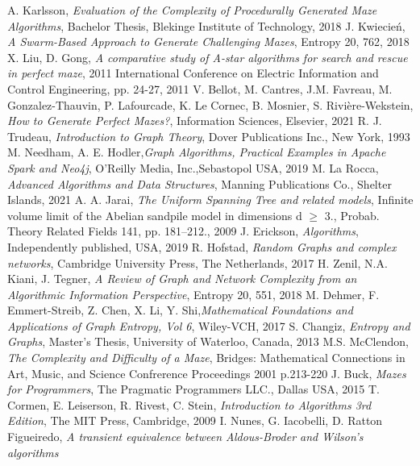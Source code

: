 
\begin{thebibliography}{100}
A. Karlsson, \emph{Evaluation of the Complexity of Procedurally Generated Maze Algorithms}, Bachelor Thesis,
Blekinge Institute of Technology, 2018
J. Kwiecień, \emph{A Swarm-Based Approach to Generate Challenging Mazes}, Entropy 20, 762, 2018
X. Liu, D. Gong, \emph{A comparative study of A-star algorithms for search and rescue in perfect maze}, 2011 International Conference
on Electric Information and Control Engineering, pp. 24-27, 2011
V. Bellot, M. Cantres, J.M. Favreau, M. Gonzalez-Thauvin, P. Lafourcade, K. Le Cornec, B. Mosnier, S. Rivière-Wekstein,
\emph{How to Generate Perfect Mazes?}, Information Sciences, Elsevier, 2021
R. J. Trudeau, \emph{Introduction to Graph Theory}, Dover Publications Inc., New York, 1993
M. Needham, A. E. Hodler,\emph{Graph Algorithms, Practical Examples in Apache Spark and Neo4j}, O’Reilly Media, Inc.,Sebastopol USA, 2019
M. La Rocca, \emph{Advanced Algorithms and Data Structures}, Manning Publications Co., Shelter Islands, 2021
A. A. Jarai, \emph{The Uniform Spanning Tree and related models},  Infinite volume limit of the Abelian sandpile model in
dimensions d $≥$ 3., Probab. Theory Related Fields 141, pp. 181–212., 2009
J. Erickson, \emph{Algorithms}, Independently published, USA, 2019
R. Hofstad, \emph{Random Graphs and complex networks}, Cambridge University Press, The Netherlands, 2017
H. Zenil, N.A. Kiani, J. Tegner, \emph{A Review of Graph and Network Complexity from an Algorithmic Information Perspective},
Entropy 20, 551, 2018
M. Dehmer, F. Emmert-Streib, Z. Chen, X. Li, Y. Shi,\emph{Mathematical Foundations and Applications of Graph Entropy, Vol 6},
Wiley-VCH, 2017
S. Changiz, \emph{Entropy and Graphs}, Master's Thesis, University of Waterloo, Canada, 2013
M.S. McClendon, \emph{The Complexity and Difficulty of a Maze}, Bridges: Mathematical Connections in Art, Music,
and Science Confrerence Proceedings 2001 p.213-220
J. Buck, \emph{Mazes for Programmers}, The Pragmatic Programmers LLC., Dallas USA, 2015
T. Cormen, E. Leiserson, R. Rivest, C. Stein, \emph{Introduction to Algorithms 3rd Edition}, The MIT Press, Cambridge, 2009
I. Nunes, G. Iacobelli, D. Ratton Figueiredo, \emph{A transient equivalence between Aldous-Broder and Wilson's algorithms
}
\end{thebibliography}
